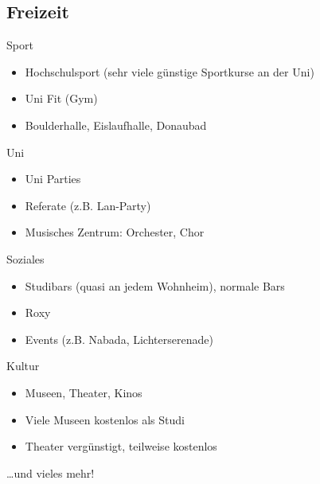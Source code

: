 \documentclass[
	aspectratio=169, 
	10pt 
]{beamer}
\begin{document}
\subsection{Freizeit}
\begin{frame}{\insertsubsection}
    \begin{fancycolumns}[T, columns=2]
        \begin{definition}{Sport}
            \begin{itemize}
                \item Hochschulsport (sehr viele günstige Sportkurse an der Uni)
                \item Uni Fit (Gym)
                \item Boulderhalle, Eislaufhalle, Donaubad
            \end{itemize}
        \end{definition}

        \begin{definition}{Uni}
            \begin{itemize}
                \item Uni Parties
                \item Referate (z.B. Lan-Party)
                \item Musisches Zentrum: Orchester, Chor
            \end{itemize}
        \end{definition}
        
        \nextcolumn
        \begin{definition}{Soziales}
            \begin{itemize}
                \item Studibars (quasi an jedem Wohnheim), normale Bars
                \item Roxy
                \item Events (z.B. Nabada, Lichterserenade) 
            \end{itemize}
        \end{definition}

        \begin{definition}{Kultur}
            \begin{itemize}
                \item Museen, Theater, Kinos
                \item Viele Museen kostenlos als Studi
                \item Theater vergünstigt, teilweise kostenlos
            \end{itemize}
        \end{definition}

    \end{fancycolumns}
    \dots und vieles mehr!
\end{frame}
\end{document}
